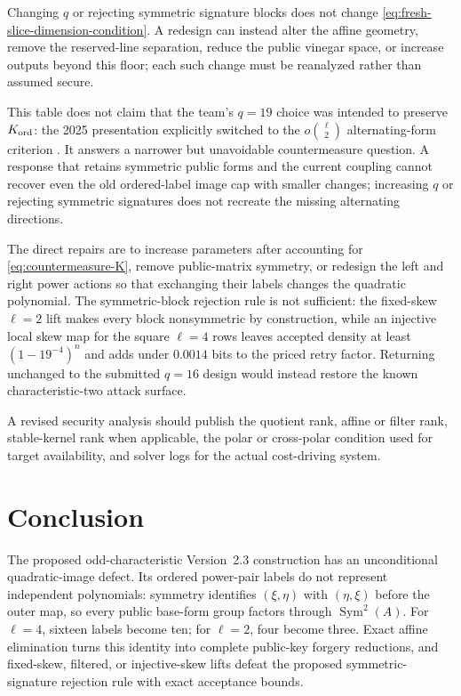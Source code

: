 \documentclass[11pt]{article}
\newcommand{\Sym}{\operatorname{Sym}}
\begin{document}
Changing $q$ or rejecting symmetric signature blocks does not change
\eqref{eq:fresh-slice-dimension-condition}.  A redesign can instead alter the
affine geometry, remove the reserved-line separation, reduce the public
vinegar space, or increase outputs beyond this floor; each such change must be
reanalyzed rather than assumed secure.

This table does not claim that the team's $q=19$ choice was intended to
preserve $K_{\rm ord}$: the 2025 presentation explicitly switched to the
$o\binom{\ell}{2}$ alternating-form criterion
\cite{WangEtAl2025Round2Security}.  It answers a narrower but unavoidable
countermeasure question.  A response that retains symmetric public forms and
the current coupling cannot recover even the old ordered-label image cap with
smaller changes; increasing $q$ or rejecting symmetric signatures does not
recreate the missing alternating directions.

The direct repairs are to increase parameters after accounting for
\eqref{eq:countermeasure-K},
remove public-matrix symmetry, or redesign the left and right power actions so
that exchanging their labels changes the quadratic polynomial.  The
symmetric-block rejection rule is not sufficient: the fixed-skew $\ell=2$
lift makes every block nonsymmetric by construction, while an injective local
skew map for the square $\ell=4$ rows leaves accepted density at least
$(1-19^{-4})^n$ and adds under $0.0014$ bits to the priced retry factor.  Returning
unchanged to the submitted $q=16$ design would instead restore the known
characteristic-two attack surface.

A revised security analysis should publish the quotient rank, affine or filter
rank, stable-kernel rank when applicable, the polar or cross-polar condition
used for target availability, and solver logs for the actual cost-driving
system.

\section{Conclusion}\label{sec:conclusion}

The proposed odd-characteristic Version~2.3 construction has an unconditional
quadratic-image defect.  Its ordered power-pair labels do not represent
independent polynomials: symmetry identifies $(\xi,\eta)$ with
$(\eta,\xi)$ before the outer map, so every public base-form group factors
through $\Sym^2(A)$.  For $\ell=4$, sixteen labels become ten; for $\ell=2$,
four become three.  Exact affine elimination turns this identity into complete
public-key forgery reductions, and fixed-skew, filtered, or injective-skew
lifts defeat the proposed symmetric-signature rejection rule with exact
acceptance bounds.
\end{document}
